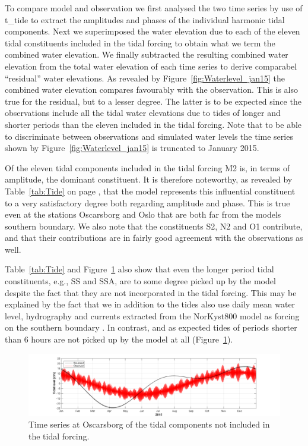 To compare model and observation we first analysed the two time series by use of t\_tide \citep{pavlo:etal:2002} to extract the amplitudes and phases of the individual harmonic tidal components. Next we superimposed the water elevation due to each of the eleven tidal constituents included in the tidal forcing to obtain what we term the combined water elevation. We finally subtracted the resulting combined water elevation from the total water elevation of each time series to derive comparabel ``residual'' water elevations. As revealed by Figure~\ref{fig:Waterlevel_jan15} the combined water elevation compares favourably with the observation. This is also true for the residual, but to a lesser degree. The latter is to be expected since the observations include all the tidal water elevations due to tides of longer and shorter periods than the eleven included in the tidal forcing. Note that to be able to discriminate between observations and simulated water levels the time series shown by Figure~\ref{fig:Waterlevel_jan15} is truncated to January 2015.

Of the eleven tidal components included in the tidal forcing M2 is, in terms of amplitude, the dominant constituent. It is therefore noteworthy, as revealed by Table~\ref{tab:Tide} on page \pageref{tab:Tide}, that the model represents this influential constituent to a very satisfactory degree both regarding amplitude and phase. This is true even at the stations Oscarsborg and Oslo that are both far from the models southern boundary. We also note that the constituents S2, N2 and O1 contribute, and that their contributions are in fairly good agreement with the observations as well. 

Table~\ref{tab:Tide} and Figure~\ref{fig:Waterlevel_tide} also show that even the longer period tidal constituents, e.g., SS and SSA, are to some degree picked up by the model despite the fact that they are not incorporated in the tidal forcing. This may be explained by the fact that we in addition to the tides also use daily mean water level, hydrography and currents extracted from the NorKyst800 model as forcing on the southern boundary \citep{roed:etal:2016}. In contrast, and as expected tides of periods shorter than 6 hours are not picked up by the model at all (Figure~\ref{fig:Waterlevel_tide}).

\begin{figure}[tbh] 
	\centerline{ \includegraphics*[trim=3cm 0cm 2.5cm 0cm,clip=true,width=\textwidth]{Figurer/Oscarsborg_Tide_not_included} } 
	\caption{\small Time series at Oscarsborg of the tidal components not included in the tidal forcing.} 
	\label{fig:Waterlevel_tide} 
\end{figure} 

